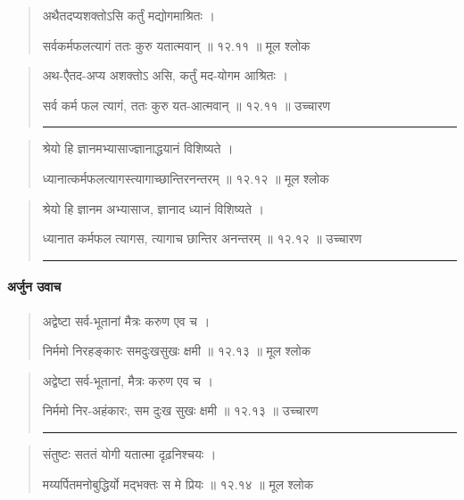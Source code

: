 \begin{quotation} 

अथैतदप्यशक्तोऽसि कर्तुं मद्योगमाश्रितः  ।  

सर्वकर्मफलत्यागं ततः कुरु यतात्मवान्‌  ॥ १२.११ ॥  मूल श्लोक
\end{quotation}

\begin{quotation}
अथ-एैतद-अप्य अशक्तोऽ असि, कर्तुं मद-योगम आश्रितः  ।  

सर्व कर्म फल त्यागं, ततः कुरु यत-आत्मवान्‌  ॥ १२.११ ॥  उच्चारण

\noindent\rule{16cm}{0.4pt} 
\end{quotation}


\begin{quotation} 

श्रेयो हि ज्ञानमभ्यासाज्ज्ञानाद्धयानं विशिष्यते  ।  

ध्यानात्कर्मफलत्यागस्त्यागाच्छान्तिरनन्तरम्‌  ॥ १२.१२ ॥  मूल श्लोक
\end{quotation}

\begin{quotation}

श्रेयो हि ज्ञानम अभ्यासाज, ज्ञानाद ध्यानं विशिष्यते  ।  

ध्यानात कर्मफल त्यागस,  त्यागाच छान्तिर अनन्तरम्‌  ॥ १२.१२ ॥  उच्चारण

\noindent\rule{16cm}{0.4pt} 
\end{quotation}




\paragraph{\sanskrit अर्जुन उवाच}
\begin{quotation} 
अद्वेष्टा सर्व-भूतानां मैत्रः करुण एव च  ।  

निर्ममो निरहङ्‍कारः समदुःखसुखः क्षमी  ॥ १२.१३ ॥  मूल श्लोक
\end{quotation}

\begin{quotation}

अद्वेष्टा सर्व-भूतानां, मैत्रः करुण एव च  ।  

निर्ममो निर-अहंकारः, सम दुःख सुखः क्षमी  ॥ १२.१३ ॥  उच्चारण

\noindent\rule{16cm}{0.4pt} 
\end{quotation}


\begin{quotation} 

संतुष्टः सततं योगी यतात्मा दृढ़निश्चयः ।  

मय्यर्पितमनोबुद्धिर्यो मद्भक्तः स मे प्रियः  ॥ १२.१४ ॥  मूल श्लोक
\end{quotation}

